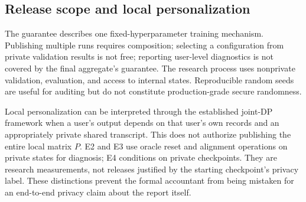 \subsection{Release scope and local personalization}
The guarantee describes one fixed-hyperparameter training mechanism. Publishing
multiple runs requires composition; selecting a configuration from private
validation results is not free; reporting user-level diagnostics is not covered
by the final aggregate's guarantee. The research process uses nonprivate
validation, evaluation, and access to internal states. Reproducible random
seeds are useful for auditing but do not constitute production-grade secure
randomness.

Local personalization can be interpreted through the established joint-DP
framework when a user's output depends on that user's own records and an
appropriately private shared transcript. This does not authorize publishing
the entire local matrix $P$. E2 and E3 use oracle reset and alignment operations
on private states for diagnosis; E4 conditions on private checkpoints. They
are research measurements, not releases justified by the starting checkpoint's
privacy label. These distinctions prevent the formal accountant from being
mistaken for an end-to-end privacy claim about the report itself.
